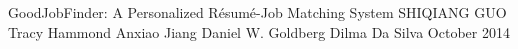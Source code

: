 \approvalfour
{GoodJobFinder: A Personalized R\'esum\'e-Job Matching System
}
{SHIQIANG GUO}%
{Tracy Hammond
}
{Anxiao Jiang
}
{Daniel W. Goldberg
}
{Dilma Da Silva}
{October 2014}%

%
%

